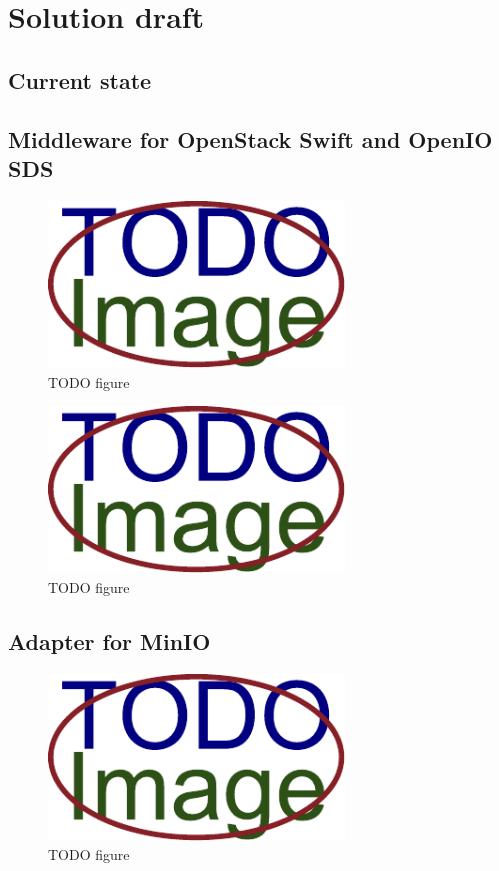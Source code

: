 \chapter{Solution draft}
    \textcolor{gray}{\Blindtext}
\section{Current state}
    \textcolor{gray}{\Blindtext}
\section{Middleware for OpenStack Swift and OpenIO SDS}
    \textcolor{gray}{\Blindtext}
    \begin{figure}[hbt]
        \centering
        \includegraphics[width=0.7\textwidth]{obrazky-figures/placeholder.pdf}
        \caption{TODO figure}
    \end{figure}
    \textcolor{gray}{\Blindtext}
    \begin{figure}[hbt]
        \centering
        \includegraphics[width=0.7\textwidth]{obrazky-figures/placeholder.pdf}
        \caption{TODO figure}
    \end{figure}
\section{Adapter for MinIO}
    \textcolor{gray}{\Blindtext}
    \begin{figure}[hbt]
        \centering
        \includegraphics[width=0.7\textwidth]{obrazky-figures/placeholder.pdf}
        \caption{TODO figure}
    \end{figure}

